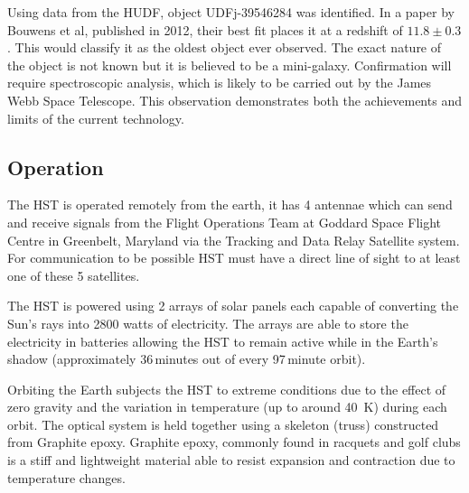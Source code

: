 		Using data from the HUDF, object UDFj-39546284 was identified. In a paper by Bouwens et al, published in 2012, their best fit places it at a redshift of $11.8\pm0.3$\cite{Bouwens2012}. This would classify it as the oldest object ever observed. The exact nature of the object is not known but it is believed to be a mini-galaxy. Confirmation will require spectroscopic analysis, which is likely to be carried out by the James Webb Space Telescope. This observation demonstrates both the achievements and limits of the current technology.

	\subsection{Operation} %
	\label{ssub:operation}
		The HST is operated remotely from the earth, it has 4 antennae which can send and receive signals from the Flight Operations Team at Goddard Space Flight Centre in Greenbelt, Maryland via the Tracking and Data Relay Satellite system. For communication to be possible HST must have a direct line of sight to at least one of these 5 satellites.

		The HST is powered using 2 arrays of solar panels each capable of converting the Sun’s rays into \num{2800} watts of electricity. The arrays are able to store the electricity in batteries allowing the HST to remain active while in the Earth’s shadow (approximately 36\,minutes out of every 97\,minute orbit).

		Orbiting the Earth subjects the HST to extreme conditions due to the effect of zero gravity and the variation in temperature (up to around \SI{40}{\kelvin}) during each orbit. The optical system is held together using a skeleton (truss) constructed from Graphite epoxy. Graphite epoxy, commonly found in racquets and golf clubs is a stiff and lightweight material able to resist expansion and contraction due to temperature changes\cite{Hubsite_4}.

